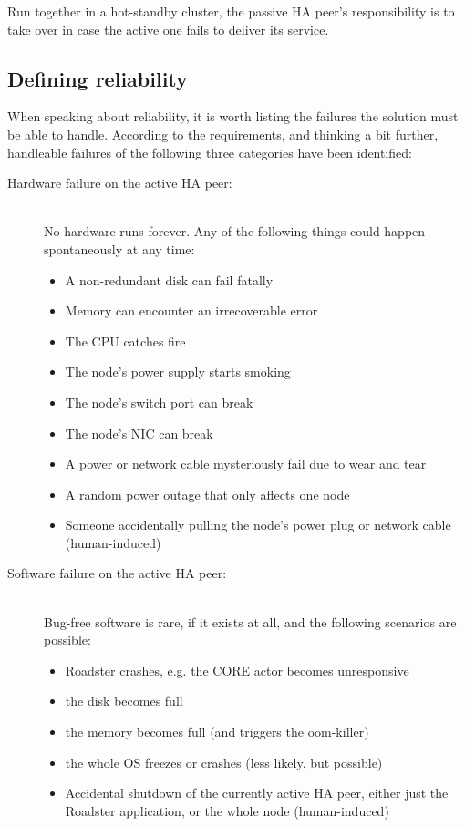 Run together in a hot-standby cluster, the passive HA peer's responsibility is to
take over in case the active one fails to deliver its service.



\subsection{Defining reliability}
When speaking about reliability, it is worth listing the failures the solution must be
able to handle. According to the requirements, and thinking a bit further,
handleable failures of the following three categories have been identified:

\begin{description}
	\item [Hardware failure on the active HA peer:] \hfill\\
		No hardware runs forever. Any of the following things could
		happen spontaneously at any time:

		\begin{itemize}
			\item A non-redundant disk can fail fatally
			\item Memory can encounter an irrecoverable error
			\item The \gls{CPU} catches fire
			\item The node's power supply starts smoking
			\item The node's switch port can break
			\item The node's \gls{NIC} can break
			\item A power or network cable mysteriously fail due to wear and tear
			\item A random power outage that only affects one node
			\item Someone accidentally pulling the node's power
				plug or network cable (human-induced)
		\end{itemize}

	\item [Software failure on the active HA peer:] \hfill\\
		Bug-free software is rare, if it exists at all, and the
		following scenarios are possible:

		\begin{itemize}
			\item Roadster crashes, e.g. the CORE actor becomes unresponsive
			\item the disk becomes full
			\item the memory becomes full (and triggers the \gls{oom-killer})
			\item the whole OS freezes or crashes (less likely, but possible)
			\item Accidental shutdown of the currently active HA
				peer, either just the Roadster application, or
				the whole node (human-induced)
		\end{itemize}


\end{description}
